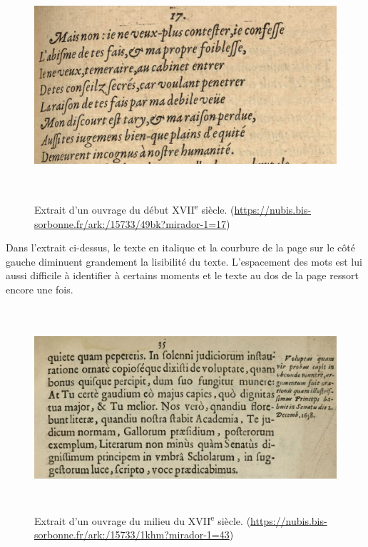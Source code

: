\documentclass[a4paper,12pt,twoside]{book}
\begin{document}
\begin{figure} [H]
	\includegraphics[width=6.26806in,height=3.27778in]{vertopal_157ae480aa4a4b07be198b586a812241/media/image7.png}
	\caption{Extrait d'un ouvrage du début XVII\textsuperscript{e}
		siècle.
		(\url{https://nubis.bis-sorbonne.fr/ark:/15733/49bk?mirador-1=17})}
\end{figure}

Dans l'extrait ci-dessus, le texte en italique et la courbure de la page sur le côté gauche diminuent grandement
la lisibilité du texte. L'espacement des mots est lui aussi difficile à identifier à certains moments et le texte au dos de la page ressort encore une fois.\\



\begin{figure} [H]
	\includegraphics[width=6.26806in,height=2.94444in]{vertopal_157ae480aa4a4b07be198b586a812241/media/image8.png}
	\caption{Extrait d'un ouvrage du milieu du XVII\textsuperscript{e}
		siècle.
		(\url{https://nubis.bis-sorbonne.fr/ark:/15733/1khm?mirador-1=43})}
\end{figure}
\end{document}
